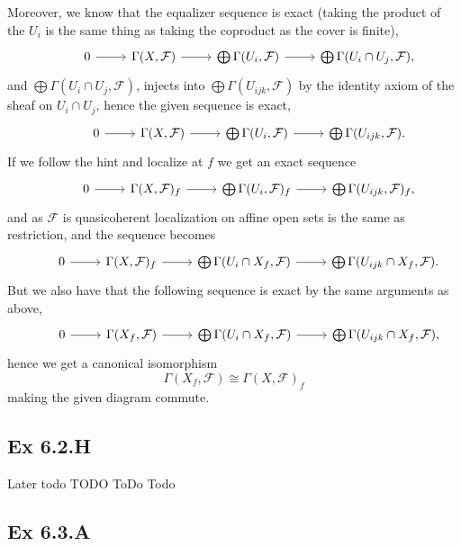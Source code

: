 \documentclass{article}
\theoremstyle{definition}
\begin{document}
Moreover, we know that the equalizer sequence is exact (taking the product of
the $U_i$ is the same thing as taking the coproduct as the cover is finite),
\[
	\begin{tikzcd}
		& 0
		\ar[r]
		& \Gamma(X, \mathcal{F})
		\ar[r]{f}
		& \bigoplus \Gamma(U_i, \mathcal{F})
		\ar[r]{g}
		& \bigoplus \Gamma(U_i \cap U_j, \mathcal{F}),
	\end{tikzcd}
\]
and $\bigoplus \Gamma(U_i \cap U_j, \mathcal{F})$, injects into
$\bigoplus \Gamma(U_{ijk}, \mathcal{F})$ by the identity axiom of the sheaf on $U_i \cap U_j$,
hence the given sequence is exact,
\[
	\begin{tikzcd}
		& 0
		\ar[r]
		& \Gamma(X, \mathcal{F})
		\ar[r]{f}
		& \bigoplus \Gamma(U_i, \mathcal{F})
		\ar[r]{g}
		& \bigoplus \Gamma(U_{ijk}, \mathcal{F}).
	\end{tikzcd}
\]
If we follow the hint and localize at $f$ we get
an exact sequence
\[
	\begin{tikzcd}
		& 0
		\ar[r]
		& \Gamma(X, \mathcal{F})_f
		\ar[r]{f}
		& \bigoplus \Gamma(U_i, \mathcal{F})_f
		\ar[r]{g}
		& \bigoplus \Gamma(U_{ijk}, \mathcal{F})_f,
	\end{tikzcd}
\]
and as $\mathcal{F}$ is quasicoherent localization on affine open sets is the same as restriction,
and the sequence becomes
\[
	\begin{tikzcd}
		& 0
		\ar[r]
		& \Gamma(X, \mathcal{F})_f
		\ar[r]{f}
		& \bigoplus \Gamma(U_i \cap X_f, \mathcal{F})
		\ar[r]{g}
		& \bigoplus \Gamma(U_{ijk} \cap X_f, \mathcal{F}).
	\end{tikzcd}
\]
But we also have that the following sequence is exact by the same arguments as above,
\[
	\begin{tikzcd}
		& 0
		\ar[r]
		& \Gamma(X_f, \mathcal{F})
		\ar[r]{f}
		& \bigoplus \Gamma(U_i \cap X_f, \mathcal{F})
		\ar[r]{g}
		& \bigoplus \Gamma(U_{ijk} \cap X_f, \mathcal{F}),
	\end{tikzcd}
\]
hence we get a canonical isomorphism
\[
	\Gamma(X_f, \mathcal{F})
	\cong
	\Gamma(X, \mathcal{F})_f
\]
making the given diagram commute.

\subsection*{Ex 6.2.H}
Later todo TODO ToDo Todo

\subsection*{Ex 6.3.A}
\end{document}
